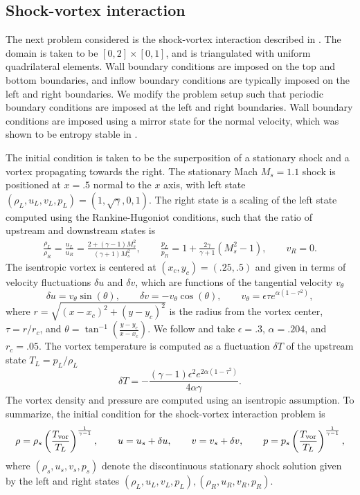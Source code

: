 \documentclass[review,onefignum,onetabnum,final]{siamart171218}
\newcommand{\LRp}[1]{\left( #1 \right)}
\begin{document}
\subsection{Shock-vortex interaction}

The next problem considered is the shock-vortex interaction described in \cite{shu1998essentially}.  The domain is taken to be $[0,2]\times [0,1]$, and is triangulated with uniform quadrilateral elements.  Wall boundary conditions are imposed on the top and bottom boundaries, and inflow boundary conditions are typically imposed on the left and right boundaries.  We modify the problem setup such that periodic boundary conditions are imposed at the left and right boundaries.  Wall boundary conditions are imposed using a mirror state for the normal velocity, which was shown to be entropy stable in \cite{svard2014entropy, chen2017entropy}.  

The initial condition is taken to be the superposition of a stationary shock and a vortex propagating towards the right.  The stationary Mach $M_s = 1.1$ shock is positioned at $x = .5$ normal to the $x$ axis, with left state $\LRp{\rho_L, u_L, v_L, p_L} = \LRp{1, \sqrt{\gamma}, 0, 1}$.  The right state is a scaling of the left state computed using the Rankine-Hugoniot conditions, such that the ratio of upstream and downstream states is
\begin{align*}
\frac{\rho_L}{\rho_R} = \frac{u_L}{u_R} = \frac{2+ (\gamma-1) M_s^2}{(\gamma+1)M_s^2}, \qquad \frac{p_L}{p_R} = 1+ \frac{2\gamma}{\gamma+1}\LRp{M_s^2-1}, \qquad v_R = 0.
\end{align*}
The isentropic vortex is centered at $(x_c,y_c) = (.25, .5)$ and given in terms of velocity fluctuations $\delta u$ and $\delta v$, which are functions of the tangential velocity $v_{\theta}$
\[
\delta u = v_{\theta} \sin(\theta), \qquad
\delta v = -v_{\theta} \cos(\theta), \qquad
v_{\theta} = \epsilon \tau e^{\alpha(1-\tau^2)},
\]
where $r = \sqrt{(x-x_c)^2 + (y-y_c)^2}$ is the radius from the vortex center, $\tau = r/r_c$, and $\theta = \tan^{-1}\LRp{\frac{y-y_c}{x-x_c}}$.  We follow \cite{shu1998essentially} and take $\epsilon = .3$, $\alpha = .204$, and $r_c = .05$.  The vortex temperature is computed as a fluctuation $\delta T$ of the upstream state $T_L = p_L/\rho_L$
\[
\delta T =  - \frac{(\gamma-1)\epsilon^2 e^{2\alpha (1-\tau^2)}}{4\alpha\gamma}.  
\]
The vortex density and pressure are computed using an isentropic assumption.  To summarize, the initial condition for the shock-vortex interaction problem is 
\begin{gather*}
\rho = \rho_s \LRp{\frac{T_{\rm vor}}{T_L}}^{\frac{1}{\gamma-1}}, \qquad u = u_s + \delta u, \qquad v = v_s + \delta v, \qquad p = p_s \LRp{\frac{T_{\rm vor}}{T_L}}^{\frac{1}{\gamma-1}},
\end{gather*}
where $(\rho_s,  u_s, v_s, p_s)$ denote the discontinuous stationary shock solution given by the left and right states $\LRp{\rho_L, u_L, v_L, p_L}, \LRp{\rho_R, u_R, v_R, p_R}$.  
\end{document}
